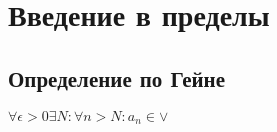 \chapter{Введение в пределы}
\section{Определение по Гейне}
$\forall \epsilon > 0 \exists N : \forall n > N: a_n \in \lor$